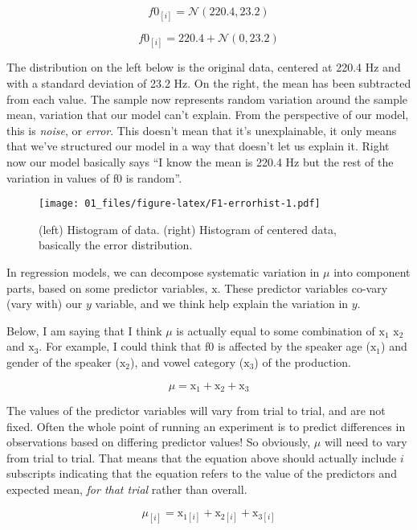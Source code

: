 \documentclass[
]{book}
\begin{document}
\[
f0_{[i]} = \mathcal{N}(220.4,23.2)
\label{eq:3}
\]

\[
f0_{[i]} = 220.4 + \mathcal{N}(0,23.2)
\label{eq:4}
\]

The distribution on the left below is the original data, centered at 220.4 Hz and with a standard deviation of 23.2 Hz. On the right, the mean has been subtracted from each value. The sample now represents random variation around the sample mean, variation that our model can't explain. From the perspective of our model, this is \emph{noise}, or \emph{error}. This doesn't mean that it's unexplainable, it only means that we've structured our model in a way that doesn't let us explain it. Right now our model basically says ``I know the mean is 220.4 Hz but the rest of the variation in values of f0 is random''.

\begin{figure}
\centering
\texttt{[image: 01\_files/figure-latex/F1-errorhist-1.pdf]}
\caption{\label{fig:F1-errorhist}(left) Histogram of data. (right) Histogram of centered data, basically the error distribution.}
\end{figure}

In regression models, we can decompose systematic variation in \(\mu\) into component parts, based on some predictor variables, \(\mathrm{x}\). These predictor variables co-vary (vary with) our \(y\) variable, and we think help explain the variation in \(y\).

Below, I am saying that I think \(\mu\) is actually equal to some combination of \(\mathrm{x}_{1}\) \(\mathrm{x}_{2}\) and \(\mathrm{x}_{3}\). For example, I could think that f0 is affected by the speaker age (\(\mathrm{x}_{1}\)) and gender of the speaker (\(\mathrm{x}_{2}\)), and vowel category (\(\mathrm{x}_{3}\)) of the production.

\[
\mu = \mathrm{x}_{1} + \mathrm{x}_{2} + \mathrm{x}_{3}
\label{eq:5}
\]

The values of the predictor variables will vary from trial to trial, and are not fixed. Often the whole point of running an experiment is to predict differences in observations based on differing predictor values! So obviously, \(\mu\) will need to vary from trial to trial. That means that the equation above should actually include \(i\) subscripts indicating that the equation refers to the value of the predictors and expected mean, \emph{for that trial} rather than overall.

\[
\mu_{[i]} = \mathrm{x}_{1[i]} + \mathrm{x}_{2[i]} + \mathrm{x}_{3[i]} \label{eq:5}
\]
\end{document}
